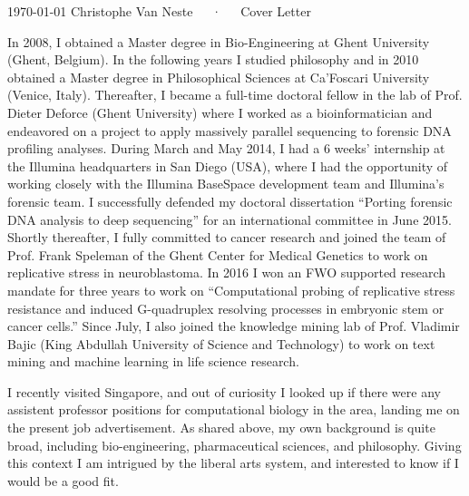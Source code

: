 \documentclass[11pt, a4paper]{awesome-cv}
\begin{document}
\makecvheader[R]

\makecvfooter
  {\today}
  {Christophe Van Neste~~~·~~~Cover Letter}
  {}

\makelettertitle

\begin{cvletter}

   In 2008, I obtained a Master degree in
  Bio-Engineering at Ghent University (Ghent, Belgium). In the
  following years I studied philosophy and in 2010 obtained a Master
  degree in Philosophical Sciences at Ca’Foscari University (Venice,
  Italy). Thereafter, I became a full-time doctoral fellow in the lab
  of Prof. Dieter Deforce (Ghent University) where I worked as a
  bioinformatician and endeavored on a project to apply massively
  parallel sequencing to forensic DNA profiling analyses. During March
  and May 2014, I had a 6 weeks’ internship at the Illumina
  headquarters in San Diego (USA), where I had the opportunity of
  working closely with the Illumina BaseSpace development team and
  Illumina’s forensic team. I successfully defended my doctoral
  dissertation “Porting forensic DNA analysis to deep sequencing” for
  an international committee in June 2015. Shortly thereafter, I fully
  committed to cancer research and joined the team of Prof. Frank
  Speleman of the Ghent Center for Medical Genetics to work on
  replicative stress in neuroblastoma. In 2016 I won an FWO supported
  research mandate for three years to work on “Computational probing
  of replicative stress resistance and induced G-quadruplex resolving
  processes in embryonic stem or cancer cells.” Since July, I also
  joined the knowledge mining lab of Prof. Vladimir Bajic (King
  Abdullah University of Science and Technology) to work on text
  mining and machine learning in life science research.

    I recently visited Singapore,
  and out of curiosity I looked up if there were any assistent
  professor positions for computational biology in the area, landing
  me on the present job advertisement. As shared above, my own
  background is quite broad, including bio-engineering, pharmaceutical
  sciences, and philosophy. Giving this context I am intrigued by the
  liberal arts system, and interested to know if I would be a good
  fit.


\end{cvletter}
\end{document}

